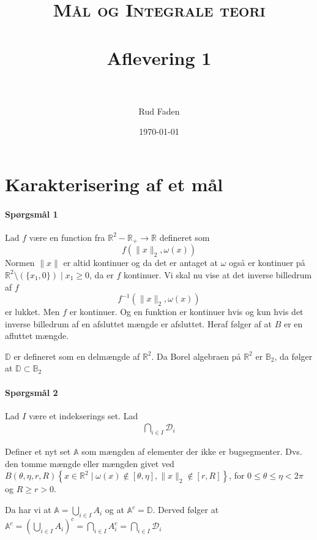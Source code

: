 \documentclass[paper=a4, fontsize=11pt]{scrartcl} %
\title{
\normalfont \normalsize
\textsc{Mål og Integrale teori} \\ [25pt] %
\horrule{0.5pt} \\[0.4cm] %
\huge Aflevering 1 \\ %
\horrule{2pt} \\[0.5cm] %
}
\author{Rud Faden} %
\date{\normalsize\today} %
\numberwithin{equation}{section} %
\numberwithin{figure}{section} %
\numberwithin{table}{section} %
\begin{document}
\maketitle %


\section{Karakterisering af et mål}

\paragraph{Spørgsmål 1}
Lad \(f\) være en function fra \(\mathbb{R}^2-\mathbb{R}_+ \rightarrow \mathbb{R}\) defineret som
\[
	f(\|x\|_2,\omega(x))
\]
Normen \(\| x\| \) er altid kontinuer og da det er antaget at \(\omega\) også er kontinuer på \(\mathbb{R}^2\setminus(\{x_1,0\})\mid x_1 \geq 0\), da er \(f\) kontinuer. Vi skal nu vise at det inverse billedrum af \(f\)
\[
	f^{-1}(\|x\|_2,\omega(x))
\]
er lukket. Men \(f\) er kontinuer.  Og en funktion er kontinuer hvis og kun hvis det inverse billedrum af en afsluttet mængde er afsluttet. Heraf følger af at \(B\) er en afluttet mængde.

\(\mathbb{D}\) er defineret som en delmængde af \(\mathbb{R}^2\). Da Borel algebraen på \(\mathbb{R}^2\) er \(\mathbb{B}_2\), da følger at \(\mathbb{D}\subset\mathbb{B}_2\)

\paragraph{Spørgsmål 2} Lad \(I\) være et indekserings set. Lad
\begin{align}
	\bigcap_{i\in I} \mathcal{D}_i \label{eq:q2-1}
\end{align}

Definer et nyt set \(\mathbb{A}\) som mængden af elementer der ikke er bugsegmenter. Dvs. den tomme mængde eller mængden givet ved \(B(\theta,\eta,r,R)\left\{x\in\mathbb{R}^2\mid \omega(x)\notin [\theta,\eta], \| x\|_2 \notin [r,R]\right\}\), for \(0\leq\theta \leq \eta <2\pi\) og \(R\geq r>0\).

	Da har vi at \(\mathbb{A}=\bigcup_{i\in I}A_i\) og at \(\mathbb{A}^c=\mathbb{D}\). Derved følger at \(\mathbb{A}^c=\left( \bigcup_{i\in I}A_i\right)^c=\bigcap_{i\in I}A_i^c=\bigcap_{i\in I}\mathcal{D}_i\)
\end{document}
